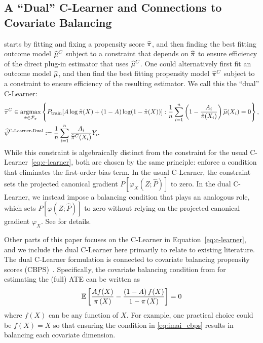 \subsection{A ``Dual'' C-Learner and Connections to Covariate Balancing}
\label{sec:balance}
 starts by fitting and fixing a propensity score $\widehat{\pi}$, and then finding the best fitting outcome model $\widehat{\mu}^C$  subject to a constraint that depends on $\widehat{\pi}$ to ensure efficiency of the direct plug-in estimator that uses $\widehat{\mu}^C$. One could alternatively first fit an outcome model $\widehat{\mu}$, and then find the best fitting propensity model $\widehat{\pi}^C$ subject to a constraint to ensure efficiency of the resulting estimator. We call this the ``dual'' C-Learner:
\begin{align}
\label{eq:c_learner_dual}
    &\widehat{\pi}^C\in \mathop{\rm argmax}_{\tilde \pi\in \mathcal F_\pi} \left\{
P_{\rm train}[ A\log \tilde \pi(X) +(1-A)\log (1-\tilde \pi(X))] : 
\frac{1}{n}\sum_{i=1}^n \left(1-\frac{A_i}{\tilde \pi(X_i)}\right) \widehat{\mu}(X_i)=0
    \right\},\nonumber
    \\
    &\widehat{\psi}^\text{C-Learner-Dual}:=\frac{1}{n}\sum_{i=1}^n \frac{A_i}{\widehat{\pi}^C(X_i)}Y_i  
.\end{align}
While this constraint is algebraically distinct from the constraint for the usual C-Learner~\eqref{eq:c-learner}, both are chosen by the same principle: enforce a condition that eliminates the first-order bias term. In the usual C-Learner, the constraint sets the projected canonical gradient $P[\varphi_X(Z;\hat P)]$ to zero. In the dual C-Learner, we instead impose a balancing condition that plays an analogous role, which sets $P[\varphi(Z;\hat P)]$ to zero without relying on the projected canonical gradient $\varphi_X$. See  for details.


 Other parts of this paper focuses on the C-Learner in Equation~\eqref{eq:c-learner}, and we include the dual C-Learner here primarily to relate to existing literature.
The dual C-Learner formulation is connected to covariate balancing propensity scores (CBPS)~\cite{imai2014covariate}. Specifically, 
the covariate balancing condition from \citep{imai2014covariate} for estimating the (full) ATE can be written as 
\begin{align}
\label{eq:imai_cbps}
\mathbb{E}\left[\frac{A f(X)}{ \pi\left(X\right)}-\frac{\left(1-A\right) f(X)}{1-\pi\left(X\right)}\right]=0
\end{align}
where $f(X)$ can be any function of $X$. For example, one practical choice could be $f(X)=X$ so that ensuring the condition in \eqref{eq:imai_cbps} results in balancing each covariate dimension. %

